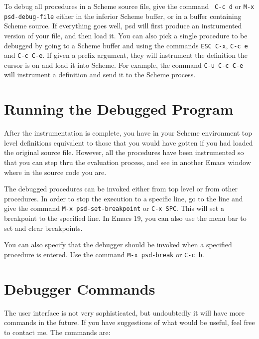To debug all procedures in a Scheme source file, give the command {\tt
C-c d} or {\tt M-x psd-debug-file} either in the inferior Scheme
buffer, or in a buffer containing Scheme source. If everything goes
well, psd will first produce an instrumented version of your file, and
then load it. You can also pick a single procedure to be debugged by
going to  a Scheme buffer and using the commands
{\tt ESC C-x}, {\tt C-c e} and {\tt C-c C-e}. If given a prefix
argument, they will instrument the definition the cursor is on and
load it into Scheme. For example, the command {\tt C-u C-c C-e} will
instrument a definition and send it to the Scheme process.

\section{Running the Debugged Program}

After the instrumentation is complete, you have in your Scheme
environment top level definitions equivalent to those that you would
have gotten if you had loaded the original source file. However, all
the procedures have been instrumented so that you can step thru the
evaluation process, and see in another Emacs window where in the
source code you are.

The debugged procedures can be invoked either from top level or from
other procedures. In order to stop the execution to a specific line,
go to the line and give the command {\tt M-x psd-set-breakpoint} or
{\tt C-x SPC}. This will set a breakpoint to the specified line. In
Emacs 19, you can also use the menu bar to set and clear breakpoints.

You can also specify that the debugger should be invoked when a
specified procedure is entered. Use the command {\tt M-x psd-break} or
{\tt C-c b}.

\section{Debugger Commands}

The user interface is not very sophisticated, but undoubtedly it will
have more commands in the future. If you have suggestions of what
would be useful, feel free to contact me. The commands are:


